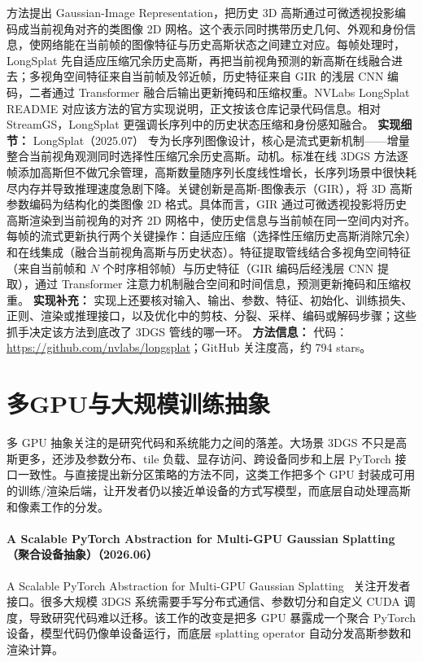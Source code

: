 方法提出 Gaussian-Image Representation，把历史 3D 高斯通过可微透视投影编码成当前视角对齐的类图像 2D 网格。这个表示同时携带历史几何、外观和身份信息，使网络能在当前帧的图像特征与历史高斯状态之间建立对应。每帧处理时，LongSplat 先自适应压缩冗余历史高斯，再把当前视角预测的新高斯在线融合进去；多视角空间特征来自当前帧及邻近帧，历史特征来自 GIR 的浅层 CNN 编码，二者通过 Transformer 融合后输出更新掩码和压缩权重。NVLabs LongSplat README 对应该方法的官方实现说明，正文按该仓库记录代码信息。相对 StreamGS，LongSplat 更强调长序列中的历史状态压缩和身份感知融合。
\textbf{实现细节：} LongSplat（2025.07） 专为长序列图像设计，核心是流式更新机制——增量整合当前视角观测同时选择性压缩冗余历史高斯。动机。标准在线 3DGS 方法逐帧添加高斯但不做冗余管理，高斯数量随序列长度线性增长，长序列场景中很快耗尽内存并导致推理速度急剧下降。关键创新是高斯-图像表示（GIR），将 3D 高斯参数编码为结构化的类图像 2D 格式。具体而言，GIR 通过可微透视投影将历史高斯渲染到当前视角的对齐 2D 网格中，使历史信息与当前帧在同一空间内对齐。每帧的流式更新执行两个关键操作：自适应压缩（选择性压缩历史高斯消除冗余）和在线集成（融合当前视角高斯与历史状态）。特征提取管线结合多视角空间特征（来自当前帧和 $N$ 个时序相邻帧）与历史特征（GIR 编码后经浅层 CNN 提取），通过 Transformer 注意力机制融合空间和时间信息，预测更新掩码和压缩权重。
\textbf{实现补充：} 实现上还要核对输入、输出、参数、特征、初始化、训练损失、正则、渲染或推理接口，以及优化中的剪枝、分裂、采样、编码或解码步骤；这些抓手决定该方法到底改了 3DGS 管线的哪一环。
\textbf{方法信息：} 代码：\url{https://github.com/nvlabs/longsplat}；GitHub 关注度高，约 794 stars。



\section{多GPU与大规模训练抽象}

多 GPU 抽象关注的是研究代码和系统能力之间的落差。大场景 3DGS 不只是高斯更多，还涉及参数分布、tile 负载、显存访问、跨设备同步和上层 PyTorch 接口一致性。与直接提出新分区策略的方法不同，这类工作把多个 GPU 封装成可用的训练/渲染后端，让开发者仍以接近单设备的方式写模型，而底层自动处理高斯和像素工作的分发。



\paragraph{A Scalable PyTorch Abstraction for Multi-GPU Gaussian Splatting（聚合设备抽象）（2026.06）}
A Scalable PyTorch Abstraction for Multi-GPU Gaussian Splatting~\cite{2606_11390} 关注开发者接口。很多大规模 3DGS 系统需要手写分布式通信、参数切分和自定义 CUDA 调度，导致研究代码难以迁移。该工作的改变是把多 GPU 暴露成一个聚合 PyTorch 设备，模型代码仍像单设备运行，而底层 splatting operator 自动分发高斯参数和渲染计算。


